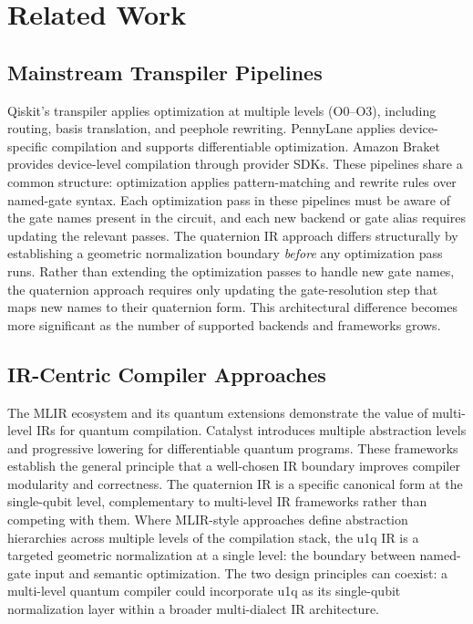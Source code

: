 \documentclass[conference]{IEEEtran}
\begin{document}
\section{Related Work}

\subsection{Mainstream Transpiler Pipelines}

Qiskit's transpiler \cite{b1} applies optimization at multiple levels (O0--O3), including
routing, basis translation, and peephole rewriting. PennyLane \cite{b2} applies
device-specific compilation and supports differentiable optimization. Amazon Braket \cite{b3}
provides device-level compilation through provider SDKs. These pipelines share a common
structure: optimization applies pattern-matching and rewrite rules over named-gate syntax.
Each optimization pass in these pipelines must be aware of the gate names present in the
circuit, and each new backend or gate alias requires updating the relevant passes. The
quaternion IR approach differs structurally by establishing a geometric normalization
boundary \textit{before} any optimization pass runs. Rather than extending the optimization
passes to handle new gate names, the quaternion approach requires only updating the
gate-resolution step that maps new names to their quaternion form. This architectural
difference becomes more significant as the number of supported backends and frameworks
grows.

\subsection{IR-Centric Compiler Approaches}

The MLIR \cite{b4} ecosystem and its quantum extensions demonstrate the value of multi-level
IRs for quantum compilation. Catalyst \cite{b5} introduces multiple abstraction levels and
progressive lowering for differentiable quantum programs. These frameworks establish the
general principle that a well-chosen IR boundary improves compiler modularity and
correctness. The quaternion IR is a specific canonical form at the single-qubit level,
complementary to multi-level IR frameworks rather than competing with them. Where MLIR-style
approaches define abstraction hierarchies across multiple levels of the compilation stack,
the u1q IR is a targeted geometric normalization at a single level: the boundary between
named-gate input and semantic optimization. The two design principles can coexist: a
multi-level quantum compiler could incorporate u1q as its single-qubit normalization
layer within a broader multi-dialect IR architecture.
\end{document}
